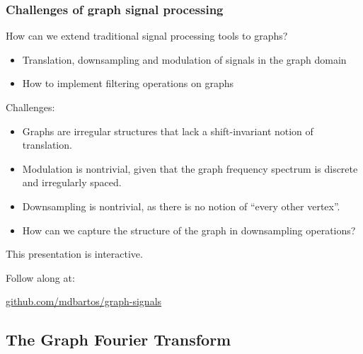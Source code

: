 \documentclass{beamer}
\begin{document}
\begin{frame}
  \frametitle{Challenges of graph signal processing}
  How can we extend traditional signal processing tools to graphs?
  \begin{itemize}
    \item Translation, downsampling and modulation of signals in the graph
      domain
    \item How to implement filtering operations on graphs
  \end{itemize}

  Challenges:
  \begin{itemize}
  \item Graphs are irregular structures that lack a shift-invariant notion of translation.
  \item Modulation is nontrivial, given that the graph frequency spectrum is
    discrete and irregularly spaced.
  \item Downsampling is nontrivial, as there is no notion of ``every other
    vertex''.
  \item How can we capture the structure of the graph in downsampling operations?
  \end{itemize}
\end{frame}

\begin{frame}
  \begin{center}
    This presentation is interactive.

    \vspace{1cm}
    
    Follow along at:
  
    \url{github.com/mdbartos/graph-signals}
  \end{center}
\end{frame}


\subsection{The Graph Fourier Transform}
\end{document}
